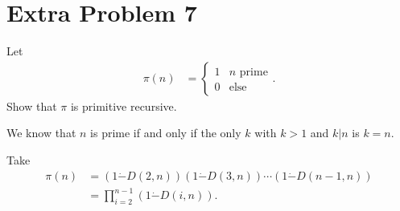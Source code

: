 \documentclass[10pt]{mypackage}
\begin{document}
\section{Extra Problem 7}%
\begin{problem}
  Let
  \begin{align*}
    \pi(n) &= \begin{cases}
      1 & \text{$n$ prime}\\
      0 & \text{else}
    \end{cases}.
  \end{align*}
  Show that $\pi$ is primitive recursive.
\end{problem}
\begin{solution}
  We know that $n$ is prime if and only if the only $k$ with $k > 1$ and $k | n$ is $k=n$.\newline

  Take
  \begin{align*}
    \pi\left(n\right) &= \left(1\dot{-}D\left(2,n\right)\right)\left(1\dot{-}D\left(3,n\right)\right)\cdots \left(1\dot{-}D\left(n-1,n\right)\right)\\
                      &= \prod_{i=2}^{n-1}\left(1\dot{-}D\left(i,n\right)\right).
  \end{align*}
  
\end{solution}
\end{document}

